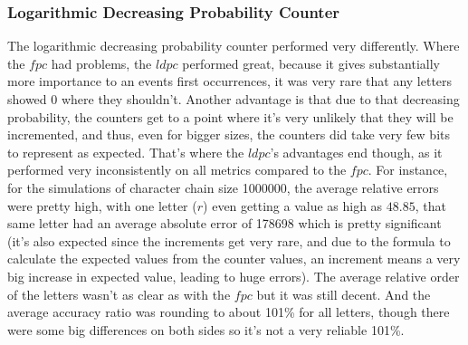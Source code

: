 \documentclass[...]{revdetua}
\begin{document}
\subsubsection{Logarithmic Decreasing Probability Counter}
The logarithmic decreasing probability counter performed very differently.
Where the $fpc$ had problems, the $ldpc$ performed great, because it gives substantially more importance to an events first occurrences, it was very rare that any letters showed 0 where they shouldn't. Another advantage is that due to that decreasing probability, the counters get to a point where it's very unlikely that they will be incremented, and thus, even for bigger sizes, the counters did take very few bits to represent as expected.
That's where the $ldpc$'s advantages end though, as it performed very inconsistently on all metrics  compared to the $fpc$.
For instance, for the simulations of character chain size 1000000, the average relative errors were pretty high, with one letter ($r$) even getting a value as high as $48.85$, that same letter had an average absolute error of 178698 which is pretty significant (it's also expected since the increments get very rare, and due to the formula to calculate the expected values from the counter values, an increment means a very big increase in expected value, leading to huge errors). The average relative order of the letters wasn't as clear as with the $fpc$ but it was still decent. And the average accuracy ratio was rounding to about 101\% for all letters, though there were some big differences on both sides so it's not a very reliable 101\%.
\end{document}
